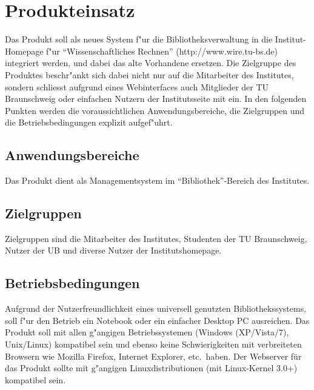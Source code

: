 \chapter{Produkteinsatz}
Das Produkt soll als neues System f"ur die Bibliotheksverwaltung in die Institut-Homepage f"ur "`Wissenschaftliches Rechnen"' (http://www.wire.tu-bs.de) integriert werden, und dabei das alte Vorhandene ersetzen. Die Zielgruppe des Produktes beschr"ankt sich dabei nicht nur auf die Mitarbeiter des Institutes, sondern schliesst aufgrund eines Webinterfaces auch Mitglieder der TU Braunschweig oder einfachen Nutzern der Institutsseite mit ein. 
In den folgenden Punkten werden die voraussichtlichen Anwendungsbereiche, die Zielgruppen und die Betriebsbedingungen explizit aufgef"uhrt. 

\section{Anwendungsbereiche}
Das Produkt dient als Managementsystem im "`Bibliothek"'-Bereich des Institutes.

\section{Zielgruppen}
Zielgruppen sind die Mitarbeiter des Institutes, Studenten der TU Braunschweig, Nutzer der \gls{UB} und diverse Nutzer der Institutshomepage.

\section{Betriebsbedingungen}
Aufgrund der Nutzerfreundlichkeit eines universell genutzten Bibliothekssystems, soll 
f"ur den Betrieb ein Notebook oder ein einfacher Desktop PC ausreichen. Das Produkt soll mit allen g"angigen Betriebssystemen (Windows (XP/Vista/7), Unix/Linux) kompatibel sein und ebenso keine Schwierigkeiten mit verbreiteten Browsern wie Mozilla Firefox, Internet Explorer, etc.\ haben. Der Webserver für das Produkt sollte mit g"angigen Linuxdistributionen (mit Linux-Kernel 3.0+) kompatibel sein. 